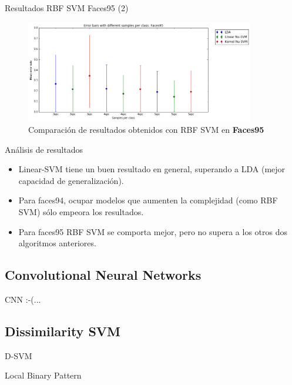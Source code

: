 \documentclass{beamer}
\begin{document}
\begin{frame}{Resultados RBF SVM Faces95 (2)}
\begin{figure}[htpb!]
\centering
\includegraphics[width=10cm]{ksvm_rescomp95}
\caption{Comparación de resultados obtenidos con RBF SVM en \textbf{Faces95}}
\end{figure}
\end{frame}

\begin{frame}{Análisis de resultados}
\begin{itemize}
	\item Linear-SVM tiene un buen resultado en general, superando a LDA (mejor capacidad de generalización).
	\item Para faces94, ocupar modelos que aumenten la complejidad (como RBF SVM) sólo empeora los resultados. 
	\item Para faces95 RBF SVM se comporta mejor, pero no supera a los otros dos algoritmos anteriores.
\end{itemize}
\end{frame}

\subsection{Convolutional Neural Networks}

\begin{frame}{CNN}
:-(...
\end{frame}




\subsection{Dissimilarity SVM}

\begin{frame}{D-SVM}
\end{frame}



\begin{frame}{Local Binary Pattern}
\end{frame}
\end{document}
